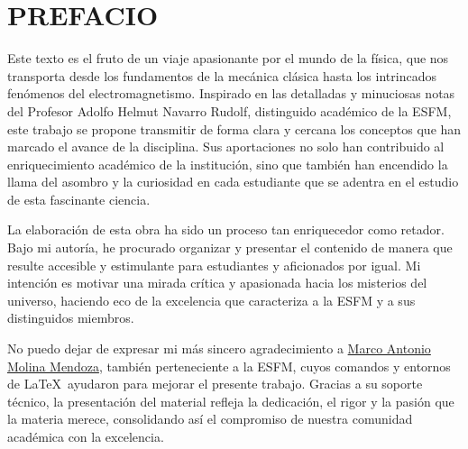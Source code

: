 \chapter*{PREFACIO}

Este texto es el fruto de un viaje apasionante por el mundo de la física, que nos transporta desde los fundamentos de la mecánica clásica hasta los intrincados fenómenos del electromagnetismo. Inspirado en las detalladas y minuciosas notas del Profesor Adolfo Helmut Navarro Rudolf, distinguido académico de la ESFM, este trabajo se propone transmitir de forma clara y cercana los conceptos que han marcado el avance de la disciplina. Sus aportaciones no solo han contribuido al enriquecimiento académico de la institución, sino que también han encendido la llama del asombro y la curiosidad en cada estudiante que se adentra en el estudio de esta fascinante ciencia.

La elaboración de esta obra ha sido un proceso tan enriquecedor como retador. Bajo mi autoría, he procurado organizar y presentar el contenido de manera que resulte accesible y estimulante para estudiantes y aficionados por igual. Mi intención es motivar una mirada crítica y apasionada hacia los misterios del universo, haciendo eco de la excelencia que caracteriza a la ESFM y a sus distinguidos miembros.

No puedo dejar de expresar mi más sincero agradecimiento a \href{https://github.com/antobno}{\color{mainc}Marco Antonio Molina Mendoza}, también perteneciente a la ESFM, cuyos comandos y entornos de \LaTeX\ ayudaron para mejorar el presente trabajo. Gracias a su soporte técnico, la presentación del material refleja la dedicación, el rigor y la pasión que la materia merece, consolidando así el compromiso de nuestra comunidad académica con la excelencia.

